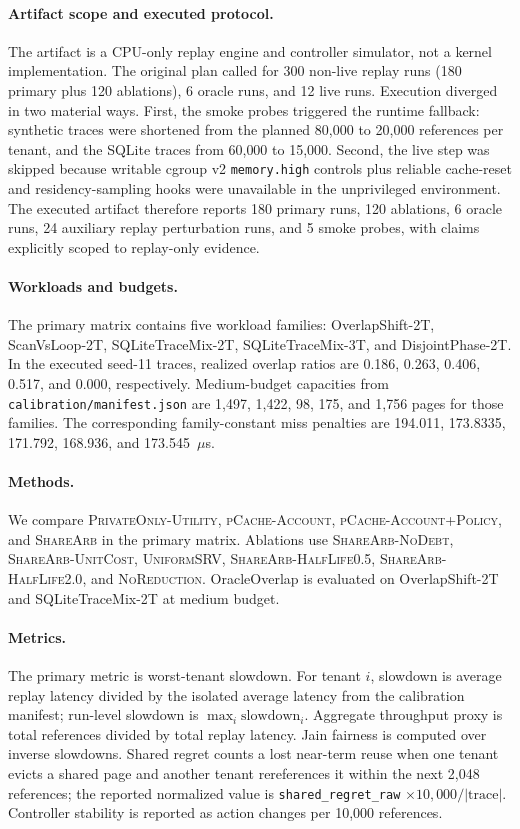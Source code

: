 \documentclass{article}
\newcommand{\sharearb}{\textsc{ShareArb}\xspace}
\newcommand{\pcache}{\textsc{pCache-Account}\xspace}
\newcommand{\pcachepol}{\textsc{pCache-Account+Policy}\xspace}
\newcommand{\privateonly}{\textsc{PrivateOnly-Utility}\xspace}
\begin{document}
\paragraph{Artifact scope and executed protocol.}
The artifact is a CPU-only replay engine and controller simulator, not a kernel implementation. The original plan called for 300 non-live replay runs (180 primary plus 120 ablations), 6 oracle runs, and 12 live runs. Execution diverged in two material ways. First, the smoke probes triggered the runtime fallback: synthetic traces were shortened from the planned 80{,}000 to 20{,}000 references per tenant, and the SQLite traces from 60{,}000 to 15{,}000. Second, the live step was skipped because writable cgroup v2 \texttt{memory.high} controls plus reliable cache-reset and residency-sampling hooks were unavailable in the unprivileged environment. The executed artifact therefore reports 180 primary runs, 120 ablations, 6 oracle runs, 24 auxiliary replay perturbation runs, and 5 smoke probes, with claims explicitly scoped to replay-only evidence.

\paragraph{Workloads and budgets.}
The primary matrix contains five workload families: OverlapShift-2T, ScanVsLoop-2T, SQLiteTraceMix-2T, SQLiteTraceMix-3T, and DisjointPhase-2T. In the executed seed-11 traces, realized overlap ratios are 0.186, 0.263, 0.406, 0.517, and 0.000, respectively. Medium-budget capacities from \texttt{calibration/manifest.json} are 1{,}497, 1{,}422, 98, 175, and 1{,}756 pages for those families. The corresponding family-constant miss penalties are 194.011, 173.8335, 171.792, 168.936, and 173.545~$\mu$s.

\paragraph{Methods.}
We compare \privateonly, \pcache, \pcachepol, and \sharearb in the primary matrix. Ablations use \textsc{ShareArb-NoDebt}, \textsc{ShareArb-UnitCost}, \textsc{UniformSRV}, \textsc{ShareArb-HalfLife0.5}, \textsc{ShareArb-HalfLife2.0}, and \textsc{NoReduction}. OracleOverlap is evaluated on OverlapShift-2T and SQLiteTraceMix-2T at medium budget.

\paragraph{Metrics.}
The primary metric is worst-tenant slowdown. For tenant $i$, slowdown is average replay latency divided by the isolated average latency from the calibration manifest; run-level slowdown is $\max_i \mathrm{slowdown}_i$. Aggregate throughput proxy is total references divided by total replay latency. Jain fairness is computed over inverse slowdowns. Shared regret counts a lost near-term reuse when one tenant evicts a shared page and another tenant rereferences it within the next 2{,}048 references; the reported normalized value is \texttt{shared\_regret\_raw} $\times 10{,}000 / |\mathrm{trace}|$. Controller stability is reported as action changes per 10{,}000 references.
\end{document}
